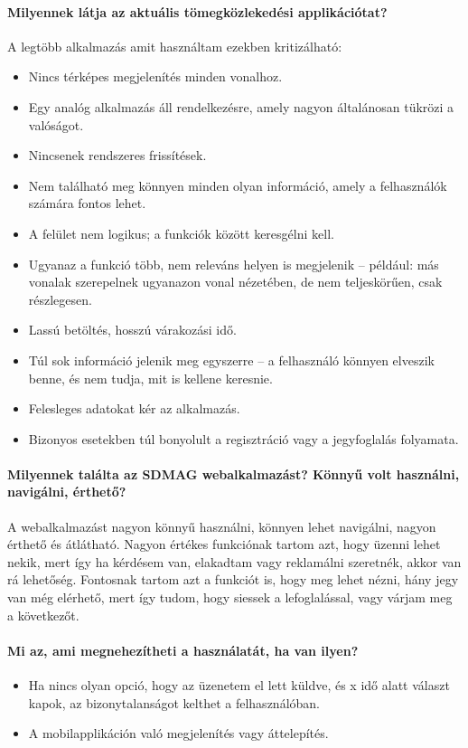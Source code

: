 \paragraph*{Milyennek látja az aktuális tömegközlekedési applikációtat?}
A legtöbb alkalmazás amit használtam ezekben kritizálható:
\begin{itemize}
    \item Nincs térképes megjelenítés minden vonalhoz.
    \item Egy analóg alkalmazás áll rendelkezésre, amely nagyon általánosan tükrözi a valóságot.
    \item Nincsenek rendszeres frissítések.
    \item Nem található meg könnyen minden olyan információ, amely a felhasználók számára fontos lehet.
    \item A felület nem logikus; a funkciók között keresgélni kell.
    \item Ugyanaz a funkció több, nem releváns helyen is megjelenik – például: más vonalak szerepelnek ugyanazon vonal nézetében, de nem teljeskörűen, csak részlegesen.
    \item Lassú betöltés, hosszú várakozási idő.
    \item Túl sok információ jelenik meg egyszerre – a felhasználó könnyen elveszik benne, és nem tudja, mit is kellene keresnie.
    \item Felesleges adatokat kér az alkalmazás.
    \item Bizonyos esetekben túl bonyolult a regisztráció vagy a jegyfoglalás folyamata.
\end{itemize}

\paragraph*{Milyennek találta az SDMAG webalkalmazást? Könnyű volt használni, navigálni, érthető?}
 A webalkalmazást nagyon könnyű használni, könnyen lehet navigálni, nagyon érthető és átlátható. Nagyon értékes funkciónak tartom azt, hogy üzenni lehet nekik, mert így ha kérdésem van, elakadtam vagy reklamálni szeretnék, akkor van rá lehetőség. Fontosnak tartom azt a funkciót is, hogy meg lehet nézni, hány jegy van még elérhető, mert így tudom, hogy siessek a lefoglalással, vagy várjam meg a következőt.

\paragraph*{Mi az, ami megnehezítheti a használatát, ha van ilyen?}
\begin{itemize}
    \item Ha nincs olyan opció, hogy az üzenetem el lett küldve, és x idő alatt választ kapok, az bizonytalanságot kelthet a felhasználóban.
    \item A mobilapplikáción való megjelenítés vagy áttelepítés.
\end{itemize}

